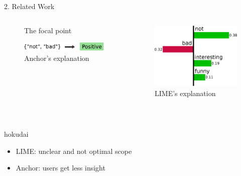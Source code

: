 \documentclass[unicode]{beamer}
\begin{document}
\begin{frame}
\begin{columns}[t]
\begin{column}{\lcol\linewidth}
\begin{block}{2. Related Work}
\begin{columns}[]
\begin{column}{0.4\textwidth}
\begin{figure}
							\caption{The focal point}
						\end{figure}
						\vspace{0.5em}
						\begin{figure}
							\includegraphics[width=\textwidth]{src/img/example-anchor}
							\caption{Anchor's explanation}
						\end{figure}
					\end{column}
					\begin{column}{0.35\textwidth}
						\begin{figure}
							\includegraphics[width=\textwidth]{src/img/example-lime}
							\caption{LIME's explanation}
						\end{figure}
					\end{column}
				\end{columns}
				\vspace{0.3em}
				{
					\begin{center}~%
						\begin{beamercolorbox}[wd=0.7\textwidth,colsep=0.3cm,rounded=true,shadow=true]{hokudai}
							\vspace{-0.2em}
							\begin{itemize}
								\item LIME\@: unclear and not optimal scope
								\item Anchor: users get less insight
							\end{itemize}
							\vspace{0.1em}

\end{beamercolorbox}
\end{center}}
\end{block}
\end{column}
\end{columns}
\end{frame}
\end{document}
